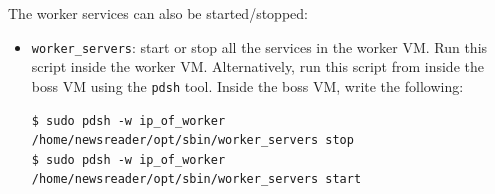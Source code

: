 \documentclass[a4]{article}
\begin{document}
The worker services can also be started/stopped:
\begin{itemize}
\item \texttt{worker\_servers}: start or stop all the services in the worker
  VM. Run this script inside the worker VM. Alternatively, run this script
  from inside the boss VM using the \texttt{pdsh} tool. Inside the boss VM,
  write the following:
\begin{verbatim}
$ sudo pdsh -w ip_of_worker /home/newsreader/opt/sbin/worker_servers stop
$ sudo pdsh -w ip_of_worker /home/newsreader/opt/sbin/worker_servers start
\end{verbatim}
\end{itemize}
\end{document}
